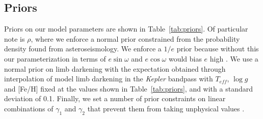 \documentclass[apjl]{emulateapj}
\begin{document}






\subsection{Priors}
Priors on our model parameters are shown in Table~\ref{tab:priors}. Of particular note is $\rho$, where we enforce a normal prior constrained from the probability density found from asteroseismology. We enforce a $1/e$ prior because without this our parameterization in terms of $e\sin{\omega}$ and $e\cos{\omega}$ would bias $e$ high \citep{eastman13}. We use a normal prior on limb darkening with the expectation obtained through interpolation of model limb darkening in the \emph{Kepler} bandpass with $T_{eff}$, $\log{g}$ and [Fe/H] fixed at the values shown in Table~\ref{tab:priors}, and with a standard deviation of 0.1. Finally, we set a number of prior constraints on linear combinations of $\gamma_1$ and $\gamma_2$ that prevent them from taking unphysical values \citep{burke08}.
\end{document}
